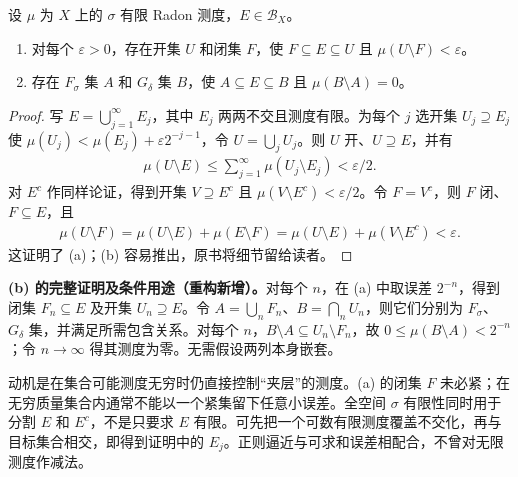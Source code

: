 \documentclass[../../main.tex]{subfiles}
\begin{document}
\begin{proposition}\label{proposition:ch07-open-closed-approximation}
设 $\mu$ 为 $X$ 上的 $\sigma$ 有限 Radon 测度，$E\in\mathscr B_X$。
\begin{enumerate}[label=\alph*.,ref=(\alph*)]
\item\label{item:ch07-open-closed-epsilon} 对每个 $\varepsilon>0$，存在开集 $U$ 和闭集 $F$，使 $F\subseteq E\subseteq U$ 且 $\mu(U\setminus F)<\varepsilon$。
\item\label{item:ch07-fsigma-gdelta-null} 存在 $F_\sigma$ 集 $A$ 和 $G_\delta$ 集 $B$，使 $A\subseteq E\subseteq B$ 且 $\mu(B\setminus A)=0$。
\end{enumerate}
\end{proposition}
\begin{proof}
写 $E=\bigcup_{j=1}^\infty E_j$，其中 $E_j$ 两两不交且测度有限。为每个 $j$ 选开集 $U_j\supseteq E_j$ 使 $\mu(U_j)<\mu(E_j)+\varepsilon2^{-j-1}$，令 $U=\bigcup_jU_j$。则 $U$ 开、$U\supseteq E$，并有
\begin{align*}
\mu(U\setminus E)\leqslant\sum_{j=1}^\infty\mu(U_j\setminus E_j)<\varepsilon/2.
\end{align*}
对 $E^c$ 作同样论证，得到开集 $V\supseteq E^c$ 且 $\mu(V\setminus E^c)<\varepsilon/2$。令 $F=V^c$，则 $F$ 闭、$F\subseteq E$，且
\begin{align*}
\mu(U\setminus F)=\mu(U\setminus E)+\mu(E\setminus F)
=\mu(U\setminus E)+\mu(V\setminus E^c)<\varepsilon.
\end{align*}
这证明了 (a)；(b) 容易推出，原书将细节留给读者。
\end{proof}
\begin{remark}
\textbf{(b) 的完整证明及条件用途（重构新增）。}对每个 $n$，在 (a) 中取误差 $2^{-n}$，得到闭集 $F_n\subseteq E$ 及开集 $U_n\supseteq E$。令 $A=\bigcup_nF_n$、$B=\bigcap_nU_n$，则它们分别为 $F_\sigma$、$G_\delta$ 集，并满足所需包含关系。对每个 $n$，$B\setminus A\subseteq U_n\setminus F_n$，故 $0\leqslant\mu(B\setminus A)<2^{-n}$；令 $n\to\infty$ 得其测度为零。无需假设两列本身嵌套。

动机是在集合可能测度无穷时仍直接控制“夹层”的测度。(a) 的闭集 $F$ 未必紧；在无穷质量集合内通常不能以一个紧集留下任意小误差。全空间 $\sigma$ 有限性同时用于分割 $E$ 和 $E^c$，不是只要求 $E$ 有限。可先把一个可数有限测度覆盖不交化，再与目标集合相交，即得到证明中的 $E_j$。正则逼近与可求和误差相配合，不曾对无限测度作减法。
\end{remark}
\end{document}

